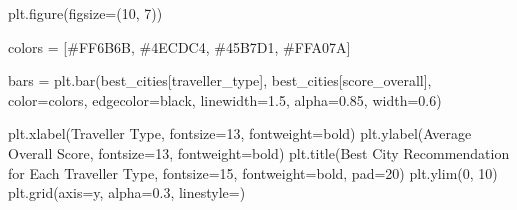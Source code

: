\documentclass[
  letterpaper,
  DIV=11,
  numbers=noendperiod]{scrartcl}
\newenvironment{Shaded}{\begin{snugshade}}{\end{snugshade}}
\newcommand{\DecValTok}[1]{\textcolor[rgb]{0.68,0.00,0.00}{#1}}
\newcommand{\FloatTok}[1]{\textcolor[rgb]{0.68,0.00,0.00}{#1}}
\newcommand{\NormalTok}[1]{\textcolor[rgb]{0.00,0.23,0.31}{#1}}
\newcommand{\OperatorTok}[1]{\textcolor[rgb]{0.37,0.37,0.37}{#1}}
\newcommand{\StringTok}[1]{\textcolor[rgb]{0.13,0.47,0.30}{#1}}
\begin{document}
\begin{Shaded}
\begin{Highlighting}[]
\NormalTok{plt.figure(figsize}\OperatorTok{=}\NormalTok{(}\DecValTok{10}\NormalTok{, }\DecValTok{7}\NormalTok{))}

\NormalTok{colors }\OperatorTok{=}\NormalTok{ [}\StringTok{\textquotesingle{}\#FF6B6B\textquotesingle{}}\NormalTok{, }\StringTok{\textquotesingle{}\#4ECDC4\textquotesingle{}}\NormalTok{, }\StringTok{\textquotesingle{}\#45B7D1\textquotesingle{}}\NormalTok{, }\StringTok{\textquotesingle{}\#FFA07A\textquotesingle{}}\NormalTok{]}

\NormalTok{bars }\OperatorTok{=}\NormalTok{ plt.bar(best\_cities[}\StringTok{\textquotesingle{}traveller\_type\textquotesingle{}}\NormalTok{], }
\NormalTok{               best\_cities[}\StringTok{\textquotesingle{}score\_overall\textquotesingle{}}\NormalTok{], }
\NormalTok{               color}\OperatorTok{=}\NormalTok{colors, }
\NormalTok{               edgecolor}\OperatorTok{=}\StringTok{\textquotesingle{}black\textquotesingle{}}\NormalTok{, }
\NormalTok{               linewidth}\OperatorTok{=}\FloatTok{1.5}\NormalTok{, }
\NormalTok{               alpha}\OperatorTok{=}\FloatTok{0.85}\NormalTok{,}
\NormalTok{               width}\OperatorTok{=}\FloatTok{0.6}\NormalTok{)}

\NormalTok{plt.xlabel(}\StringTok{\textquotesingle{}Traveller Type\textquotesingle{}}\NormalTok{, fontsize}\OperatorTok{=}\DecValTok{13}\NormalTok{, fontweight}\OperatorTok{=}\StringTok{\textquotesingle{}bold\textquotesingle{}}\NormalTok{)}
\NormalTok{plt.ylabel(}\StringTok{\textquotesingle{}Average Overall Score\textquotesingle{}}\NormalTok{, fontsize}\OperatorTok{=}\DecValTok{13}\NormalTok{, fontweight}\OperatorTok{=}\StringTok{\textquotesingle{}bold\textquotesingle{}}\NormalTok{)}
\NormalTok{plt.title(}\StringTok{\textquotesingle{}Best City Recommendation for Each Traveller Type\textquotesingle{}}\NormalTok{, }
\NormalTok{          fontsize}\OperatorTok{=}\DecValTok{15}\NormalTok{, fontweight}\OperatorTok{=}\StringTok{\textquotesingle{}bold\textquotesingle{}}\NormalTok{, pad}\OperatorTok{=}\DecValTok{20}\NormalTok{)}
\NormalTok{plt.ylim(}\DecValTok{0}\NormalTok{, }\DecValTok{10}\NormalTok{)}
\NormalTok{plt.grid(axis}\OperatorTok{=}\StringTok{\textquotesingle{}y\textquotesingle{}}\NormalTok{, alpha}\OperatorTok{=}\FloatTok{0.3}\NormalTok{, linestyle}\OperatorTok{=}\StringTok{\textquotesingle{}{-}{-}\textquotesingle{}}\NormalTok{)}


\end{Highlighting}
\end{Shaded}
\end{document}
